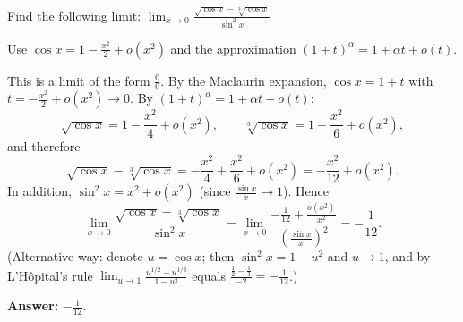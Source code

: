 
\begin{question}
Find the following limit:
$\displaystyle\lim_{x\to0}\frac{\sqrt{\cos x}-\sqrt[3]{\cos x}}{\sin^2x}$
\end{question}

\begin{hint}
Use $\cos x=1-\frac{x^2}{2}+o(x^2)$ and the approximation $(1+t)^\alpha=1+\alpha t+o(t)$.
\end{hint}

\begin{solution}
This is a limit of the form $\frac00$. By the Maclaurin expansion, $\cos x=1+t$ with $t=-\frac{x^2}{2}+o(x^2)\to0$. By $(1+t)^\alpha=1+\alpha t+o(t)$:
\[
\sqrt{\cos x}=1-\frac{x^2}{4}+o(x^2),\qquad \sqrt[3]{\cos x}=1-\frac{x^2}{6}+o(x^2),
\]
and therefore
\[
\sqrt{\cos x}-\sqrt[3]{\cos x}=-\frac{x^2}{4}+\frac{x^2}{6}+o(x^2)=-\frac{x^2}{12}+o(x^2).
\]
In addition, $\sin^2x=x^2+o(x^2)$ (since $\frac{\sin x}{x}\to1$). Hence
\[
\lim_{x\to0}\frac{\sqrt{\cos x}-\sqrt[3]{\cos x}}{\sin^2x}=\lim_{x\to0}\frac{-\frac{1}{12}+\frac{o(x^2)}{x^2}}{\left(\frac{\sin x}{x}\right)^2}=-\frac1{12}.
\]
(Alternative way: denote $u=\cos x$; then $\sin^2x=1-u^2$ and $u\to1$, and by L'Hôpital's rule $\lim_{u\to1}\frac{u^{1/2}-u^{1/3}}{1-u^2}$ equals $\frac{\frac12-\frac13}{-2}=-\frac1{12}$.)

\textbf{Answer:} $-\frac{1}{12}$.
\end{solution}
